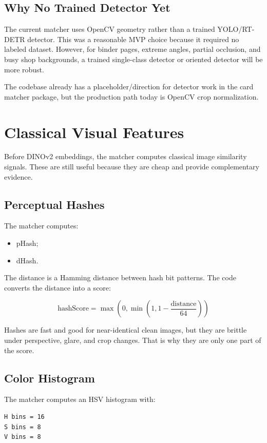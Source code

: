 \documentclass[11pt,a4paper]{article}
\begin{document}
\subsection{Why No Trained Detector Yet}

The current matcher uses OpenCV geometry rather than a trained YOLO/RT-DETR detector. This was a reasonable MVP choice because it required no labeled dataset. However, for binder pages, extreme angles, partial occlusion, and busy shop backgrounds, a trained single-class detector or oriented detector will be more robust.

The codebase already has a placeholder/direction for detector work in the card matcher package, but the production path today is OpenCV crop normalization.

\section{Classical Visual Features}

Before DINOv2 embeddings, the matcher computes classical image similarity signals. These are still useful because they are cheap and provide complementary evidence.

\subsection{Perceptual Hashes}

The matcher computes:

\begin{itemize}
  \item pHash;
  \item dHash.
\end{itemize}

The distance is a Hamming distance between hash bit patterns. The code converts the distance into a score:

\[
\text{hashScore} = \max(0, \min(1, 1 - \frac{\text{distance}}{64}))
\]

Hashes are fast and good for near-identical clean images, but they are brittle under perspective, glare, and crop changes. That is why they are only one part of the score.

\subsection{Color Histogram}

The matcher computes an HSV histogram with:

\begin{lstlisting}
H bins = 16
S bins = 8
V bins = 8
\end{lstlisting}
\end{document}

